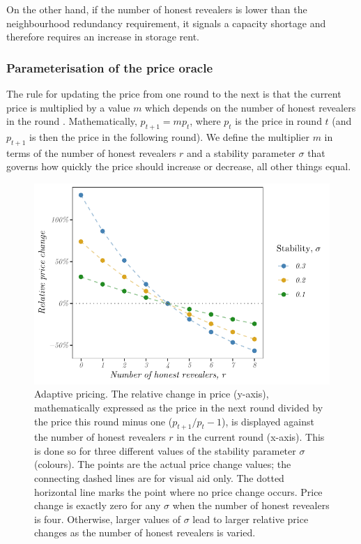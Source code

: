 On the other hand, if the number of honest revealers is lower than the neighbourhood redundancy requirement, it signals a capacity shortage and therefore requires an increase in storage rent. 




\subsubsection{Parameterisation of the price oracle}

The rule for updating the price from one round to the next is that the current price is multiplied by a value $m$ which depends on the number of honest revealers in the round%
. Mathematically, $p_{t+1} = m p_t$, where $p_t$ is the price in round $t$ (and $p_{t+1}$ is then the price in the following round). We define the multiplier $m$ in terms of the number of honest revealers $r$ and a stability parameter $\sigma$ that governs how quickly the price should increase or decrease, all other things equal. 

\begin{figure}[!ht]
  \centering
  \includegraphics[width=.7\textwidth]{fig/adaptive-pricing.pdf}
  \caption[Adaptive pricing]{Adaptive pricing. The relative change in price (y-axis), mathematically expressed as the price in the next round divided by the price this round minus one ($p_{t+1} / p_t - 1$), is displayed against the number of honest revealers $r$ in the current round (x-axis). This is done so for three different values of the stability parameter $\sigma$ (colours). The points are the actual price change values; the connecting dashed lines are for visual aid only. The dotted horizontal line marks the point where no price change occurs. Price change is exactly zero for any $\sigma$ when the number of honest revealers is four. Otherwise, larger values of $\sigma$ lead to larger relative price changes as the number of honest revealers is varied.}
  \label{fig:adaptive-pricing}
\end{figure}

